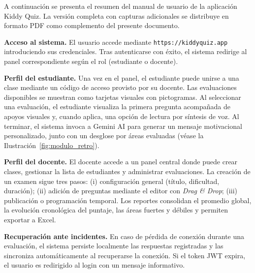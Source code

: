 A continuación se presenta el resumen del manual de usuario de la aplicación Kiddy Quiz. La versión completa con capturas adicionales se distribuye en formato PDF como complemento del presente documento.

\textbf{Acceso al sistema.} El usuario accede mediante \texttt{https://kiddyquiz.app} introduciendo sus credenciales. Tras autenticarse con éxito, el sistema redirige al panel correspondiente según el rol (estudiante o docente).

\textbf{Perfil del estudiante.} Una vez en el panel, el estudiante puede unirse a una clase mediante un código de acceso provisto por su docente. Las evaluaciones disponibles se muestran como tarjetas visuales con pictogramas. Al seleccionar una evaluación, el estudiante visualiza la primera pregunta acompañada de apoyos visuales y, cuando aplica, una opción de lectura por síntesis de voz. Al terminar, el sistema invoca a Gemini AI para generar un mensaje motivacional personalizado, junto con un desglose por áreas evaluadas (véase la Ilustración~\ref{fig:modulo_retro}).

\textbf{Perfil del docente.} El docente accede a un panel central donde puede crear clases, gestionar la lista de estudiantes y administrar evaluaciones. La creación de un examen sigue tres pasos: (i) configuración general (título, dificultad, duración); (ii) adición de preguntas mediante el editor con \textit{Drag \& Drop}; (iii) publicación o programación temporal. Los reportes consolidan el promedio global, la evolución cronológica del puntaje, las áreas fuertes y débiles y permiten exportar a Excel.

\textbf{Recuperación ante incidentes.} En caso de pérdida de conexión durante una evaluación, el sistema persiste localmente las respuestas registradas y las sincroniza automáticamente al recuperarse la conexión. Si el token JWT expira, el usuario es redirigido al login con un mensaje informativo.
